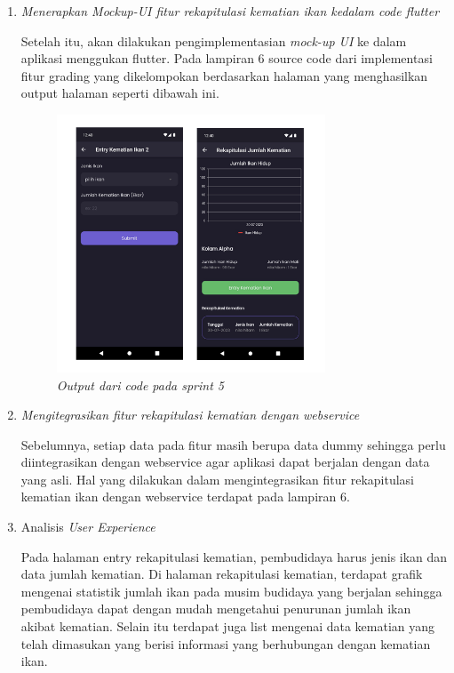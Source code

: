 \begin{enumerate}[listparindent=2em]
	\item{\textit{Menerapkan Mockup-UI fitur rekapitulasi kematian ikan kedalam code flutter}}
	
	Setelah itu, akan dilakukan pengimplementasian \textit{mock-up UI} ke dalam aplikasi menggukan flutter. Pada lampiran 6 source code dari implementasi fitur grading yang dikelompokan berdasarkan halaman yang menghasilkan output halaman seperti dibawah ini.

	\begin{figure}[H]
		\centering
		\includegraphics[keepaspectratio, width=8cm]{gambar/sssprint5}
		\caption{\textit{Output dari code pada sprint 5}}
		\label{gambar:sssprint5}
		\end{figure}

	\item{\textit{Mengitegrasikan fitur rekapitulasi kematian dengan webservice}}

	Sebelumnya, setiap data pada fitur masih berupa data dummy sehingga perlu diintegrasikan dengan webservice agar aplikasi dapat berjalan dengan data yang asli. Hal yang dilakukan dalam mengintegrasikan fitur rekapitulasi kematian ikan dengan webservice terdapat pada lampiran 6.

  \item{Analisis \textit{User Experience}} 
 
  Pada halaman entry rekapitulasi kematian, pembudidaya harus jenis ikan dan data jumlah kematian. Di halaman rekapitulasi kematian, terdapat grafik mengenai statistik jumlah ikan  pada musim budidaya yang berjalan sehingga pembudidaya dapat dengan mudah mengetahui penurunan jumlah ikan akibat kematian. Selain itu terdapat juga list mengenai data kematian yang telah dimasukan yang berisi informasi yang berhubungan dengan kematian ikan.


\end{enumerate}
